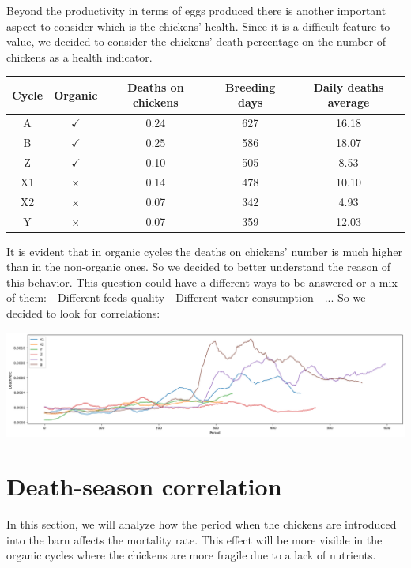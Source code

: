 \documentclass[11pt]{article}
\begin{document}
Beyond the productivity in terms of eggs produced there is another important aspect to consider which is the chickens' health. Since it is a difficult feature to value, 
we decided to consider the chickens' death percentage on the number of chickens as a health indicator.

\begin{center}
    \begin{tabular}{| c | c | c | c | c |} 
        \hline
        Cycle & Organic & Deaths on chickens & Breeding days & Daily deaths average \\ [0.5ex] 
        \hline
        A & $\checkmark$ & 0.24 & 627 & 16.18 \\ [0.5ex] 
        \hline
        B & $\checkmark$ & 0.25 & 586 & 18.07 \\ [0.5ex] 
        \hline
        Z & $\checkmark$ & 0.10 & 505 & 8.53 \\ [0.5ex] 
        \hline
        X1 & $\times$ & 0.14 & 478 & 10.10 \\ [0.5ex] 
        \hline
        X2 & $\times$ & 0.07 & 342 & 4.93 \\ [0.5ex] 
        \hline
        Y & $\times$ & 0.07 & 359 & 12.03 \\ [0.5ex] 
        \hline
    \end{tabular}
\end{center}

It is evident that in organic cycles the deaths on chickens' number is much higher than in the non-organic ones. So we decided to better understand the reason of this behavior.
This question could have a different ways to be answered or a mix of them:
- Different feeds quality
- Different water consumption
- ...
So we decided to look for correlations:

\includegraphics[width=\linewidth]{../Results/OrganingOrNot/DeathPerc.png}


\section{Death-season correlation}
In this section, we will analyze how the period when the chickens are introduced into the barn affects the mortality rate. This effect will be more visible in the organic cycles where the chickens are more fragile due to a lack of nutrients.
\end{document}

